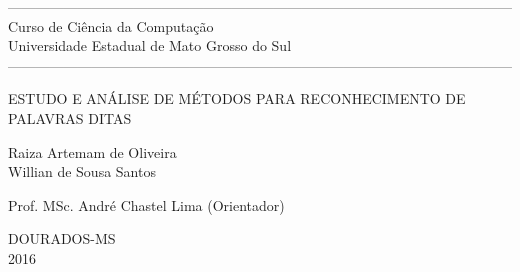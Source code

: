 \thispagestyle{empty}
\begin{center}

------------------------------------------------------------------------------------------------------------
\normalsize{Curso de Ciência da Computação \\ Universidade Estadual de Mato Grosso do Sul}
------------------------------------------------------------------------------------------------------------

\vspace*{3cm}

\Large{ESTUDO E ANÁLISE DE MÉTODOS PARA RECONHECIMENTO DE PALAVRAS DITAS}


\vspace*{3cm}
\normalsize{Raiza Artemam de Oliveira \\ Willian de Sousa Santos}

\vspace*{2cm}

\normalsize{Prof. MSc. André Chastel Lima (Orientador)}

\vspace*{6cm}


\large{DOURADOS-MS \\ 2016}
\end{center}